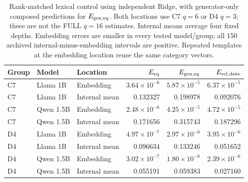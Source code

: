 \begin{table}[t]
\centering
\small
\begin{tabular}{lllrrr}
\toprule
Group & Model & Location & $E_{\rm eq}$ & $E_{\rm gen,eq}$ & $E_{\rm rel,data}$ \\
\midrule
C7 & Llama 1B & Embedding & $3.64\!\times\!10^{-6}$ & $5.87\!\times\!10^{-5}$ & $6.37\!\times\!10^{-5}$ \\
C7 & Llama 1B & Internal mean & 0.132327 & 0.198978 & 0.092076 \\
C7 & Qwen 1.5B & Embedding & $2.48\!\times\!10^{-6}$ & $4.25\!\times\!10^{-5}$ & $4.72\!\times\!10^{-5}$ \\
C7 & Qwen 1.5B & Internal mean & 0.171656 & 0.315743 & 0.187296 \\
D4 & Llama 1B & Embedding & $4.97\!\times\!10^{-7}$ & $2.97\!\times\!10^{-6}$ & $3.95\!\times\!10^{-6}$ \\
D4 & Llama 1B & Internal mean & 0.096634 & 0.133246 & 0.051652 \\
D4 & Qwen 1.5B & Embedding & $3.02\!\times\!10^{-7}$ & $1.80\!\times\!10^{-6}$ & $2.39\!\times\!10^{-6}$ \\
D4 & Qwen 1.5B & Internal mean & 0.055191 & 0.059383 & 0.027160 \\
\bottomrule
\end{tabular}
\caption{Rank-matched lexical control using independent Ridge, with generator-only composed predictions for $E_{\rm gen,eq}$. Both locations use C7 $q=6$ or D4 $q=3$; these are not the FULL $q=16$ estimates. Internal means average four fixed depths. Embedding errors are smaller in every tested model/group; all 150 archived internal-minus-embedding intervals are positive. Repeated templates at the embedding location reuse the same category vectors.}
\label{tab:lexical-control}
\end{table}
